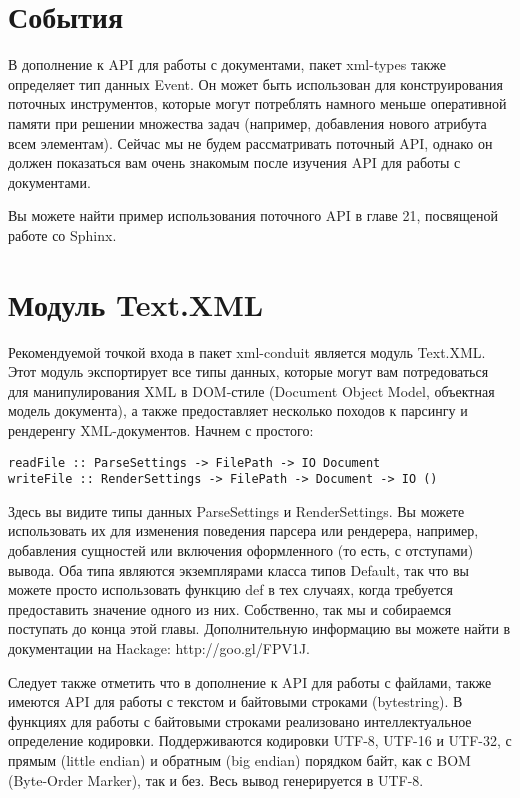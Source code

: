 \section{События} %

В дополнение к API для работы с документами, пакет xml-types также определяет тип данных Event. Он может быть использован для конструирования поточных инструментов, которые могут потреблять намного меньше оперативной памяти при решении множества задач (например, добавления нового атрибута всем элементам). Сейчас мы не будем рассматривать поточный API, однако он должен показаться вам очень знакомым после изучения API для работы с документами.

\begin{remark}
Вы можете найти пример использования поточного API в главе 21, посвященой работе со Sphinx.
\end{remark}

\section{Модуль Text.XML}

Рекомендуемой точкой входа в пакет xml-conduit является модуль Text.XML. Этот модуль экспортирует все типы данных, которые могут вам потредоваться для манипулирования XML в DOM-стиле (Document Object Model, объектная модель документа), а также предоставляет несколько походов к парсингу и рендеренгу XML-документов. Начнем с простого:

\begin{lstlisting}
readFile :: ParseSettings -> FilePath -> IO Document
writeFile :: RenderSettings -> FilePath -> Document -> IO ()
\end{lstlisting}

Здесь вы видите типы данных ParseSettings и RenderSettings. Вы можете использовать их для изменения поведения парсера или рендерера, например, добавления сущностей или включения оформленного (то есть, с отступами) вывода. Оба типа являются экземплярами класса типов Default, так что вы можете просто использовать функцию def в тех случаях, когда требуется предоставить значение одного из них. Собственно, так мы и собираемся поступать до конца этой главы. Дополнительную информацию вы можете найти в документации на Hackage: http://goo.gl/FPV1J.

Следует также отметить что в дополнение к API для работы с файлами, также имеются API для работы с текстом и байтовыми строками (bytestring). В функциях для работы с байтовыми строками реализовано интеллектуальное определение кодировки. Поддерживаются кодировки UTF-8, UTF-16 и UTF-32, с прямым (little endian) и обратным (big endian) порядком байт, как с BOM (Byte-Order Marker), так и без. Весь вывод генерируется в UTF-8.

